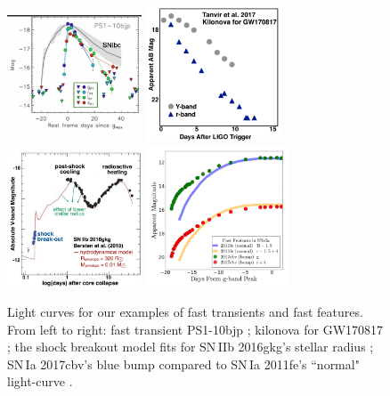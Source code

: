 \documentclass[12pt, letterpaper]{article}
\begin{document}
\begin{center}
\begin{figure}[!h]
\includegraphics[width=4cm,height=4cm]{figures/Drout_PS1-10bjp.png}
\includegraphics[width=4cm,height=4cm]{figures/Tanvir_fig2_remake.pdf}
\includegraphics[width=4cm,height=4cm]{figures/2016gkg.pdf}
\includegraphics[width=4.2cm,height=4.2cm]{figures/bluebump.png}
\caption{{\footnotesize Light curves for our examples of fast transients and fast features. From left to right: fast transient PS1-10bjp \citep{2014ApJ...794...23D}; kilonova for GW170817 \citep{2017ApJ...848L..27T}; the shock breakout model fits for SN\,IIb 2016gkg's stellar radius \citep{2018Natur.554..497B}; SN\,Ia 2017cbv's blue bump compared to SN\,Ia 2011fe's ``normal" light-curve \citep{2017ApJ...845L..11H,2015MNRAS.446.2073G}. }}
\end{figure}
\end{center}
\end{document}
